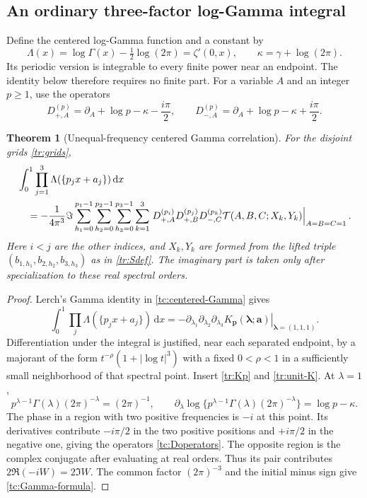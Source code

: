 \documentclass[11pt,a4paper]{article}
\numberwithin{equation}{section}
\newtheorem{theorem}{Theorem}[section]
\theoremstyle{definition}
\theoremstyle{remark}
\newcommand{\dd}{\,\mathrm d}
\begin{document}
\subsection{An ordinary three-factor log-Gamma integral}
Define the centered log-Gamma function and a constant by
\begin{equation}\label{tc:centered-Gamma}
 \Lambda(x)=\log\Gamma(x)-\tfrac12\log(2\pi)=\zeta'(0,x),
 \qquad \kappa=\gamma+\log(2\pi).
\end{equation}
Its periodic version is integrable to every finite power near an
endpoint. The identity below therefore requires no finite part.
For a variable $A$ and an integer $p\geq1$, use the operators
\begin{equation}\label{tc:Doperators}
 D_{+,A}^{(p)}=\partial_A+\log p-\kappa-\frac{i\pi}{2},
 \qquad
 D_{-,A}^{(p)}=\partial_A+\log p-\kappa+\frac{i\pi}{2}.
\end{equation}

\begin{theorem}[Unequal-frequency centered Gamma correlation]
\label{tc:Gamma-triple}
For the disjoint grids \eqref{tr:grids},
\begin{align}
 &\int_0^1\prod_{j=1}^3\Lambda(\{p_jx+a_j\})\dd x
  \notag\\
 &\quad=-\frac1{4\pi^3}\Im
   \sum_{h_1=0}^{p_1-1}\sum_{h_2=0}^{p_2-1}\sum_{h_3=0}^{p_3-1}
   \sum_{k=1}^3
   \left.
       D_{+,A}^{(p_i)}D_{+,B}^{(p_j)}D_{-,C}^{(p_k)}
       \mathcal T(A,B,C;X_k,Y_k)
   \right|_{A=B=C=1}.
   \label{tc:Gamma-formula}
\end{align}
Here $i<j$ are the other indices, and $X_k,Y_k$ are formed from the
lifted triple $(b_{1,h_1},b_{2,h_2},b_{3,h_3})$ as in
\eqref{tr:Sdef}. The imaginary part is taken only after specialization
to these real spectral orders.
\end{theorem}
\begin{proof}
Lerch's Gamma identity in \eqref{tc:centered-Gamma} gives
\[
 \int_0^1\prod_j\Lambda(\{p_jx+a_j\})\dd x
  =-\left.\partial_{\lambda_1}\partial_{\lambda_2}
               \partial_{\lambda_3}
          K_{\boldsymbol p}(\boldsymbol\lambda;\boldsymbol a)
           \right|_{\boldsymbol\lambda=(1,1,1)}.
\]
Differentiation under the integral is justified, near each separated
endpoint, by a majorant of the form
$t^{-\rho}(1+|\log t|^3)$ with a fixed $0<\rho<1$ in a sufficiently
small neighborhood of that spectral point. Insert
\eqref{tr:Kp} and \eqref{tr:unit-K}. At $\lambda=1$,
\[
 p^{\lambda-1}\Gamma(\lambda)(2\pi)^{-\lambda}=(2\pi)^{-1},
 \qquad
 \partial_\lambda\log\{p^{\lambda-1}\Gamma(\lambda)
                  (2\pi)^{-\lambda}\}=\log p-\kappa.
\]
The phase in a region with two positive frequencies is $-i$ at this
point. Its derivatives contribute $-i\pi/2$ in the two positive
positions and $+i\pi/2$ in the negative one, giving the operators
\eqref{tc:Doperators}. The opposite region is the complex conjugate
after evaluating at real orders. Thus its pair contributes
$2\Re(-iW)=2\Im W$. The common factor $(2\pi)^{-3}$ and the initial
minus sign give \eqref{tc:Gamma-formula}.
\end{proof}
\end{document}
